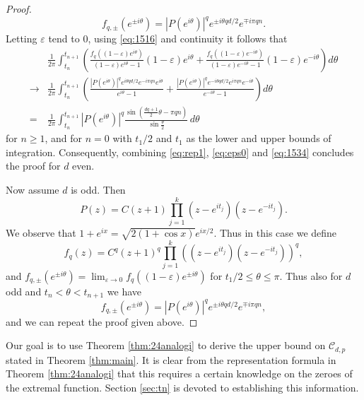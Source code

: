 \documentclass{amsart}
\theoremstyle{plain}
\theoremstyle{remark}
\begin{document}
\begin{proof}
		\begin{equation}\label{eq:1516}
			f_{q, \pm}(e^{\pm i \theta}) = |P(e^{i \theta})|^q e^{ \pm i \theta q d/2} e^{\mp i \pi q n}.
		\end{equation}
		Letting $\varepsilon$ tend to $0$, using \eqref{eq:1516} and continuity it follows that
		\begin{equation}\label{eq:1534}
			\begin{split}
				&\frac{1}{2\pi} \int_{t_n}^{t_{n+1}} \left( \frac{f_q((1-\varepsilon)e^{i \theta})}{(1-\varepsilon)e^{i\theta}-1}(1-\varepsilon)e^{i \theta} +\frac{f_q((1-\varepsilon)e^{-i \theta})}{(1-\varepsilon)e^{-i\theta}-1}(1-\varepsilon)e^{-i \theta} \right) d\theta \\
				\to &\frac{1}{2\pi} \int_{t_n}^{t_{n+1}} \left(\frac{|P(e^{i\theta})|^q e^{i \theta q d/2} e^{-i \pi q n}e^{i\theta}}{e^{i \theta}-1} +\frac{|P(e^{i\theta})|^q e^{-i \theta q d/2} e^{i \pi q n}e^{-i\theta}}{e^{-i \theta}-1} \right) d\theta\\
				=&\frac{1}{2\pi} \int_{t_n}^{t_{n+1}} |P(e^{i \theta})|^q\frac{\sin \left(\frac{dq+1}{2}\theta-\pi q n\right)}{\sin \frac{\theta}{2}}\, d\theta
		\end{split} \end{equation}
		for $n \geq 1$, and for $n=0$ with $t_1/2$ and $t_1$ as the lower and upper bounds of integration. 
		Consequently, combining \eqref{eq:rep1}, \eqref{eq:eps0} and \eqref{eq:1534} concludes the proof for $d$ even. 
		
		Now assume $d$ is odd. Then \[P(z)=C(z+1)\prod_{j=1}^{k}(z-e^{it_j})(z-e^{-it_j}).\]
		We observe that $1+e^{ix}=\sqrt{2(1+\cos x)}e^{ix/2}$. Thus in this case we define
		\[f_q(z)=C^q(z+1)^q\prod_{j=1}^{k}((z-e^{it_j})(z-e^{-it_j}))^q,\]
		and $f_{q, \pm}(e^{ \pm i \theta})=\lim_{\varepsilon \to 0} f_q((1-\varepsilon)e^{\pm i \theta})$ for $t_1/2 \leq \theta \leq \pi$. Thus also for $d$ odd and $t_n<\theta< t_{n+1}$ we have
		\[f_{q, \pm}(e^{\pm i \theta}) = |P(e^{i \theta})|^q e^{ \pm i \theta q d/2} e^{\mp i \pi q n},\] and we can repeat the proof given above. 
	\end{proof}
	Our goal is to use Theorem \ref{thm:24analogi} to derive the upper bound on $\mathscr{C}_{d,p}$ stated in Theorem \ref{thm:main}. It is clear from the representation formula in Theorem \ref{thm:24analogi} that this requires a certain knowledge on the zeroes of the extremal function. Section \ref{sec:tn} is devoted to establishing this information. 
	
\end{document}
